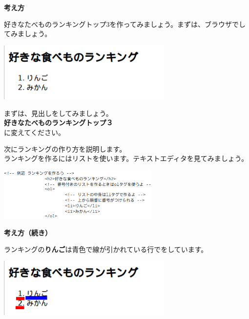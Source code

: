 \documentclass[a4paper,12pt]{jarticle}
\begin{document}
\bigskip

\textbf{考え方}



\bigskip



好きなたべものランキングトップ3を作ってみましょう。まずは、ブラウザでしてみましょう。


\bigskip

\includegraphics[width=0.65\textwidth]{textbook-img179.png}

\bigskip

まずは、見出しをしてみましょう。\\
\textbf{好きなたべものランキングトップ３}\\
に変えてください。


\bigskip

次にランキングの作り方を説明します。\\
ランキングを作るにはリストを使います。テキストエディタを見てみましょう。

\centering
\includegraphics[width=0.6\textwidth]{textbook-img180.png}

\clearpage
\flushleft
\textbf{考え方（続き）}


\bigskip


ランキングの\textbf{りんご}は青色で線が引かれている行でをしています。


\bigskip


\includegraphics[width=0.65\textwidth]{textbook-img182.png}


\bigskip
\end{document}
